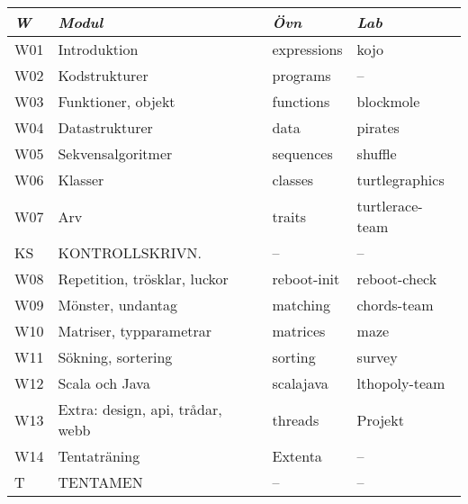 \begin{tabular}{l|l|l|l}
\textit{W} & \textit{Modul} & \textit{Övn} & \textit{Lab} \\ \hline \hline
W01 & Introduktion & expressions & kojo \\
W02 & Kodstrukturer & programs & -- \\
W03 & Funktioner, objekt & functions & blockmole \\
W04 & Datastrukturer & data & pirates \\
W05 & Sekvensalgoritmer & sequences & shuffle \\
W06 & Klasser & classes & turtlegraphics \\
W07 & Arv & traits & turtlerace-team \\
KS & KONTROLLSKRIVN. & -- & -- \\
W08 & Repetition, trösklar, luckor & reboot-init & reboot-check \\
W09 & Mönster, undantag & matching & chords-team \\
W10 & Matriser, typparametrar & matrices & maze \\
W11 & Sökning, sortering & sorting & survey \\
W12 & Scala och Java & scalajava & lthopoly-team \\
W13 & Extra: design, api, trådar, webb & threads & Projekt \\
W14 & Tentaträning & Extenta & -- \\
T & TENTAMEN & -- & -- \\
\end{tabular}
